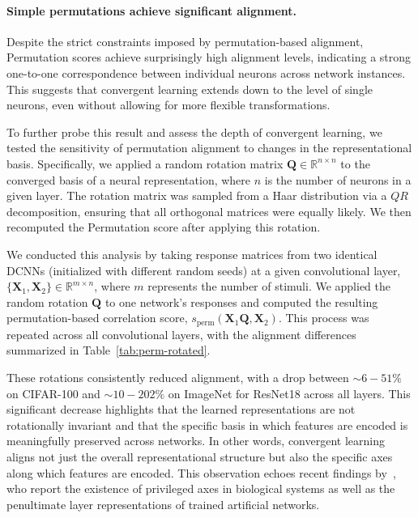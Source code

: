 \paragraph{Simple permutations achieve significant alignment.}  
\label{par: privileged-axes}
Despite the strict constraints imposed by permutation-based alignment, Permutation scores achieve surprisingly high alignment levels, indicating a strong one-to-one correspondence between individual neurons across network instances. This suggests that convergent learning extends down to the level of single neurons, even without allowing for more flexible transformations.


To further probe this result and assess the depth of convergent learning, we tested the sensitivity of permutation alignment to changes in the representational basis. Specifically, we applied a random rotation matrix $\bm{Q} \in \mathbb{R}^{n \times n}$ to the converged basis of a neural representation, where $n$ is the number of neurons in a given layer. The rotation matrix was sampled from a Haar distribution via a $QR$ decomposition, ensuring that all orthogonal matrices were equally likely. We then recomputed the Permutation score after applying this rotation.


We conducted this analysis by taking response matrices from two identical DCNNs (initialized with different random seeds) at a given convolutional layer, $\{\bm{X}_1, \bm{X}_2\} \in \mathbb{R}^{m \times n}$, where $m$ represents the number of stimuli. We applied the random rotation $\bm{Q}$ to one network’s responses and computed the resulting permutation-based correlation score, $s_{\text{perm}}(\bm{X}_1\bm{Q}, \bm{X}_2)$. This process was repeated across all convolutional layers, with the alignment differences summarized in Table~\ref{tab:perm-rotated}.

These rotations consistently reduced alignment, with a drop between $\sim6-51\%$ on CIFAR-100 and $\sim 10-202\%$ on ImageNet for ResNet18 across all layers. This significant decrease highlights that the learned representations are not rotationally invariant and that the specific basis in which features are encoded is meaningfully preserved across networks. In other words, convergent learning aligns not just the overall representational structure but also the specific axes along which features are encoded. This observation echoes recent findings by~\citep{khosla2024privileged}, who report the existence of privileged axes in biological systems as well as the penultimate layer representations of trained artificial networks.  



